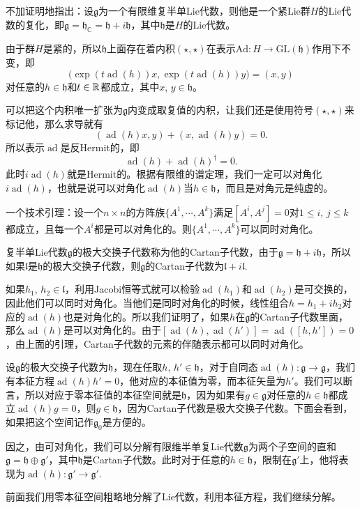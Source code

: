 \documentclass[9pt]{extarticle}
\newcommand{\cc}{\mathbb{C}}
\newcommand{\lag}{{\mathfrak{g}}}
\DeclareMathOperator{\ad}{ad}
\begin{document}
\theo 不加证明地指出：设$\lag$为一个有限维复半单Lie代数，则他是一个紧Lie群$H$的Lie代数的复化，即$\lag=\mathfrak{h}_{\cc}=\mathfrak{h}+i\mathfrak{h}$，其中$\mathfrak{h}$是$H$的Lie代数。

由于群$H$是紧的，所以$\mathfrak{h}$上面存在着内积$(\star,\star)$在表示$\mathrm{Ad}:H\to \mathrm{GL}(\mathfrak{h})$作用下不变，即
\[
	\bigl(\exp(t\ad(h))x,\exp(t\ad(h))y\bigr)=(x,y)
\]
对任意的$h\in\mathfrak{h}$和$t\in \mathbb{R}$都成立，其中$x$, $y\in\mathfrak{h}$。

可以把这个内积唯一扩张为$\lag$内变成取复值的内积，让我们还是使用符号$(\star,\star)$来标记他，那么求导就有
\[
	(\ad(h)x,y)+(x,\ad(h)y)=0.
\]
所以表示$\ad$是反Hermit的，即
\[
	\ad(h)+\ad(h)^\dag=0.
\]
此时$i\ad(h)$就是Hermit的。根据有限维的谱定理，我们一定可以对角化$i\ad(h)$，也就是说可以对角化$\ad(h)$当$h\in \mathfrak{h}$，而且是对角元是纯虚的。

\lem 一个技术引理：设一个$n\times n$的方阵族$\{A^1,\cdots,A^k\}$满足$[A^i,A^j]=0$对$1\leq i$, $j\leq k$都成立，且每一个$A^i$都是可以对角化的。则$\{A^1,\cdots,A^k\}$可以同时对角化。

\para 复半单Lie代数$\lag$的极大交换子代数称为他的Cartan子代数，由于$\lag=\mathfrak{h}+i\mathfrak{h}$，所以如果$\mathfrak{l}$是$\mathfrak{h}$的极大交换子代数，则$\lag$的Cartan子代数为$\mathfrak{l}+i\mathfrak{l}$.

如果$h_1$, $h_2\in\mathfrak{l}$，利用Jacobi恒等式就可以检验$\ad(h_1)$和$\ad(h_2)$是可交换的，因此他们可以同时对角化。当他们是同时对角化的时候，线性组合$h=h_1+ih_2$对应的$\ad(h)$也是对角化的。所以我们证明了，如果$h$在$\lag$的Cartan子代数里面，那么$\ad(h)$是可以对角化的。由于$[\ad(h),\ad(h')]=\ad([h,h'])=0$，由上面的引理，Cartan子代数的元素的伴随表示都可以同时对角化。

\para 设$\lag$的极大交换子代数为$\mathfrak{h}$，现在任取$h$, $h'\in \mathfrak{h}$，对于自同态$\ad(h):\lag\to \lag$，我们有本征方程$\ad(h)h'=0$，他对应的本征值为零，而本征矢量为$h'$。我们可以断言，所以对应于零本征值的本征空间就是$\mathfrak{h}$，因为如果有$g\in \lag$对任意的$h\in \mathfrak{h}$都成立$\ad(h)g=0$，则$g\in \mathfrak{h}$，因为Cartan子代数是极大交换子代数。下面会看到，如果把这个空间记作$\lag_0$是方便的。

因之，由可对角化，我们可以分解有限维半单复Lie代数$\lag$为两个子空间的直和$\lag=\mathfrak{h}\oplus \lag'$，其中$\mathfrak{h}$是Cartan子代数。此时对于任意的$h\in \mathfrak{h}$，限制在$\lag'$上，他将表现为$\ad(h):\lag'\to\lag'$.

\para 前面我们用零本征空间粗略地分解了Lie代数，利用本征方程，我们继续分解。
\end{document}
